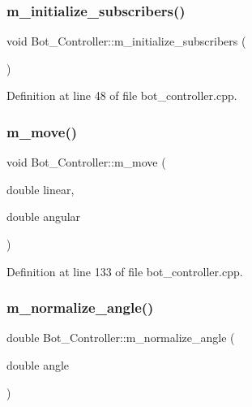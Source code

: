 \subsubsection{\texorpdfstring{m\+\_\+initialize\+\_\+subscribers()}{m\_initialize\_subscribers()}}
{\footnotesize\ttfamily void Bot\+\_\+\+Controller\+::m\+\_\+initialize\+\_\+subscribers (\begin{DoxyParamCaption}{ }\end{DoxyParamCaption})\hspace{0.3cm}{\ttfamily [protected]}}



Definition at line 48 of file bot\+\_\+controller.\+cpp.

\mbox{\label{class_bot___controller_a2e53992a4bdea36f745569bfe0035916}} 
\subsubsection{\texorpdfstring{m\+\_\+move()}{m\_move()}}
{\footnotesize\ttfamily void Bot\+\_\+\+Controller\+::m\+\_\+move (\begin{DoxyParamCaption}\item[{double}]{linear,  }\item[{double}]{angular }\end{DoxyParamCaption})\hspace{0.3cm}{\ttfamily [protected]}}



Definition at line 133 of file bot\+\_\+controller.\+cpp.

\mbox{\label{class_bot___controller_a234205057d0671c04b143ec5f794741c}} 
\subsubsection{\texorpdfstring{m\+\_\+normalize\+\_\+angle()}{m\_normalize\_angle()}}
{\footnotesize\ttfamily double Bot\+\_\+\+Controller\+::m\+\_\+normalize\+\_\+angle (\begin{DoxyParamCaption}\item[{double}]{angle }\end{DoxyParamCaption})\hspace{0.3cm}{\ttfamily [protected]}}



